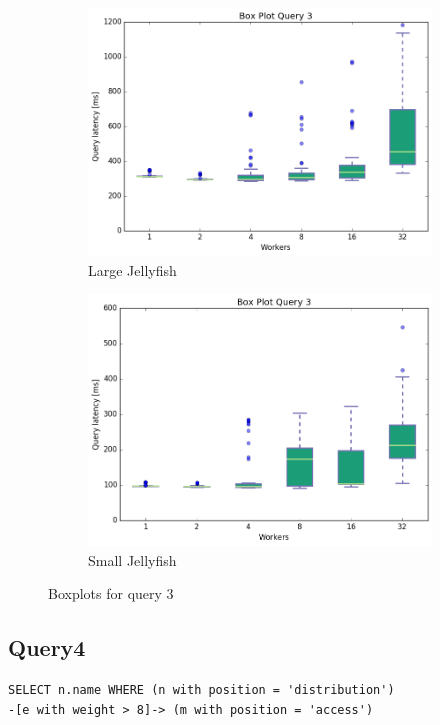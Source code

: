 \documentclass[11pt,singlecolumn]{scrartcl}
\begin{document}
\begin{figure}
\begin{subfigure}[b]{0.475\textwidth}
        \centering 
        \includegraphics[width=\textwidth]{boxesjl/q3}
        \caption[]%
        {{\small Large Jellyfish}}    
        \label{fig:mean and std of net34}
    \end{subfigure}
    \quad
    \begin{subfigure}[b]{0.475\textwidth}   
        \centering 
        \includegraphics[width=\textwidth]{boxesjs/q3}
        \caption[]%
        {{\small Small Jellyfish}}    
        \label{fig:mean and std of net44}
    \end{subfigure}
    \caption[  Boxplots for query 3 ]
    {\small Boxplots for query 3} 
    \label{fig:mean and std of nets}
\end{figure}
\clearpage
\subsection{Query4}
\begin{verbatim}
SELECT n.name WHERE (n with position = 'distribution')
-[e with weight > 8]-> (m with position = 'access')\end{verbatim}
\end{document}
